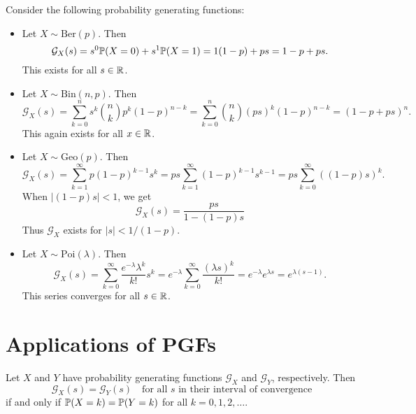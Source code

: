 \begin{example}
  Consider the following probability generating
  functions:
  \begin{itemize}
    \item Let $X \sim \mathrm{Ber}(p)$. Then
      \[
        \mathcal{G}_X(s) = s^0 \mathbb{P}(X = 0)
        + s^1 \mathbb{P}(X = 1)
        = 1(1 - p) + ps = 1 - p + ps.
      \]
      This exists for all $s \in \mathbb{R}$.
    \item Let $X \sim \mathrm{Bin}(n, p)$. Then
      \[
        \mathcal{G}_X(s) = \sum_{k = 0}^n s^k \binom{n}{k} p^k (1 - p)^{n - k}
        = \sum_{k = 0}^n \binom{n}{k} (ps)^k (1 - p)^{n - k}
        = (1 - p + ps)^n.
      \]
      This again exists for all $x \in \mathbb{R}$.
    \item Let $X \sim \mathrm{Geo}(p)$. Then
      \[
        \mathcal{G}_X(s)
        = \sum_{k = 1}^\infty p(1 - p)^{k - 1} s^k
        = ps \sum_{k = 1}^\infty (1 - p)^{k - 1} s^{k - 1}
        = ps \sum_{k = 0}^\infty ((1 - p) s)^k.
      \]
      When $|(1 - p) s| < 1$, we get
      \[
        \mathcal{G}_X(s)
        = \frac{ps}{1 - (1 - p)s}
      \]
      Thus $\mathcal{G}_X$ exists
      for $|s| < 1 / (1 - p)$.
    \item Let $X \sim \mathrm{Poi}(\lambda)$.
      Then
      \[
        \mathcal{G}_X(s)
        = \sum_{k = 0}^\infty \frac{e^{-\lambda} \lambda^k}{k!} s^k
        = e^{-\lambda} \sum_{k = 0}^\infty \frac{(\lambda s)^k}{k!}
        = e^{-\lambda} e^{\lambda s}
        = e^{\lambda(s - 1)}.
      \]
      This series converges for all $s \in \mathbb{R}$.
  \end{itemize}
\end{example}

\section{Applications of PGFs}
\begin{theorem}
  Let $X$ and $Y$ have probability generating
  functions
  $\mathcal{G}_X$ and $\mathcal{G}_Y$, respectively.
  Then
  \[\mathcal{G}_X(s) = \mathcal{G}_Y(s)
    \quad \text{for all $s$ in their interval of convergence} 
  \]
  if and only if $\mathbb{P}(X = k) = \mathbb{P}(Y = k)$ for
  all $k = 0, 1, 2, \dots$.
\end{theorem}

